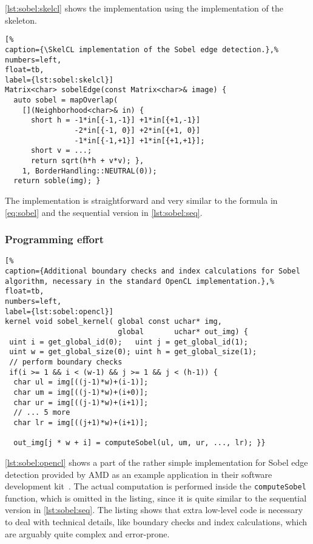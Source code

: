 \autoref{lst:sobel:skelcl} shows the \SkelCL implementation using the  implementation of the \stencil skeleton.
%
\begin{lstlisting}[%
caption={\SkelCL implementation of the Sobel edge detection.},%
numbers=left,
float=tb,
label={lst:sobel:skelcl}]
Matrix<char> sobelEdge(const Matrix<char>& image) {
  auto sobel = mapOverlap(
    [](Neighborhood<char>& in) {
      short h = -1*in[{-1,-1}] +1*in[{+1,-1}]
                -2*in[{-1, 0}] +2*in[{+1, 0}]
                -1*in[{-1,+1}] +1*in[{+1,+1}];
      short v = ...;
      return sqrt(h*h + v*v); },
    1, BorderHandling::NEUTRAL(0));
  return soble(img); }
\end{lstlisting}
%
The implementation is straightforward and very similar to the formula in \autoref{eq:sobel} and the sequential version in \autoref{lst:sobel:seq}.

\subsubsection*{Programming effort}

\begin{lstlisting}[%
caption={Additional boundary checks and index calculations for Sobel algorithm, necessary in the standard OpenCL implementation.},%
float=tb,
numbers=left,
label={lst:sobel:opencl}]
kernel void sobel_kernel( global const uchar* img,
                          global       uchar* out_img) {
 uint i = get_global_id(0);   uint j = get_global_id(1);
 uint w = get_global_size(0); uint h = get_global_size(1);
 // perform boundary checks
 if(i >= 1 && i < (w-1) && j >= 1 && j < (h-1)) {
  char ul = img[((j-1)*w)+(i-1)];
  char um = img[((j-1)*w)+(i+0)];
  char ur = img[((j-1)*w)+(i+1)];
  // ... 5 more
  char lr = img[((j+1)*w)+(i+1)];

  out_img[j * w + i] = computeSobel(ul, um, ur, ..., lr); }}
\end{lstlisting}

\autoref{lst:sobel:opencl} shows a part of the rather simple \OpenCL implementation for Sobel edge detection provided by AMD as an example application in their software development kit~\cite{AMDSDK}.
The actual computation is performed inside the \texttt{computeSobel} function, which is omitted in the listing, since it is quite similar to the sequential version in \autoref{lst:sobel:seq}.
The listing shows that extra low-level code is necessary to deal with technical details, like boundary checks and index calculations, which are arguably quite complex and error-prone.

